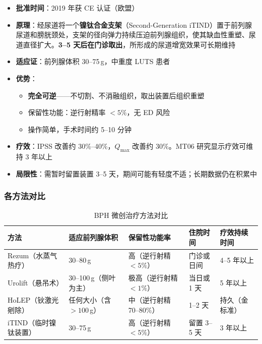 \begin{itemize}[leftmargin=2cm]
	\item \textbf{批准时间}：2019 年获 CE 认证（欧盟）
	\item \textbf{原理}：经尿道将一个\textbf{镍钛合金支架}（Second-Generation iTIND）置于前列腺尿道和膀胱颈处，支架的径向弹力持续压迫前列腺组织，使其缺血性重塑、尿道直径扩大。\textbf{3--5 天后在门诊取出}，所形成的尿道增宽效果可长期维持
	\item \textbf{适应证}：前列腺体积 30--75\,g，中重度 LUTS 患者
	\item \textbf{优势}：
	\begin{itemize}
		\item \textbf{完全可逆}——不切割、不消融组织，取出装置后组织重塑
		\item 保留性功能：逆行射精率 $<5\%$，无 ED 风险
		\item 操作简单，手术时间约 5--10 分钟
	\end{itemize}
	\item \textbf{疗效}：IPSS 改善约 30\%--40\%，$Q_{\max}$ 改善约 30\%。MT06 研究显示疗效可维持 3 年以上
	\item \textbf{局限性}：需暂时留置装置 3--5 天，期间可能有轻度不适；长期数据仍在积累中
\end{itemize}

\subsubsection{各方法对比}

\begin{table}[htbp]
\centering
\caption{BPH 微创治疗方法对比}
\label{tab:bph_minimal_invasive}
\begin{tabularx}{\textwidth}{@{}lXXXX@{}}
    \toprule
    \textbf{方法} & \textbf{适应前列腺体积} & \textbf{保留性功能率} & \textbf{住院时间} & \textbf{疗效持续时间} \\
    \midrule
    Rezum（水蒸气热疗） & 30--80\,g & 高（逆行射精 $<5\%$） & 门诊或日间 & 4--5 年以上 \\
    Urolift（悬吊术） & 30--100\,g（侧叶为主） & 极高（逆行射精 $<1\%$） & 当日或 1 天 & 5 年以上 \\
    HoLEP（钬激光剜除） & 任何大小（含 $>100$\,g） & 中（逆行射精 70--80\%） & 1--2 天 & 持久（金标准） \\
    iTIND（临时镍钛装置） & 30--75\,g & 高（逆行射精 $<5\%$） & 留置 3--5 天 & 3 年以上 \\
    \bottomrule
\end{tabularx}
\end{table}

